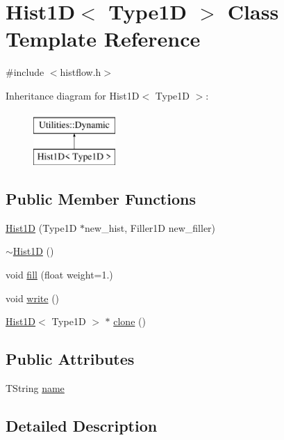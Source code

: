 \hypertarget{classHist1D}{}\section{Hist1D$<$ Type1D $>$ Class Template Reference}
\label{classHist1D}


{\ttfamily \#include $<$histflow.\+h$>$}

Inheritance diagram for Hist1D$<$ Type1D $>$\+:\begin{figure}[H]
\begin{center}
\leavevmode
\includegraphics[height=2.000000cm]{classHist1D}
\end{center}
\end{figure}
\subsection*{Public Member Functions}
\begin{DoxyCompactItemize}
\item 
\hyperlink{classHist1D_a76378975401f2dcd3635244ca8614664}{Hist1D} (Type1D $\ast$new\+\_\+hist, Filler1D new\+\_\+filler)
\item 
\hyperlink{classHist1D_a26a713a3b0f55a885fd6f110407990ee}{$\sim$\+Hist1D} ()
\item 
void \hyperlink{classHist1D_af9ae5dd7a2aca46be456dde196db8fba}{fill} (float weight=1.)
\item 
void \hyperlink{classHist1D_ae45c2073b4c8f25a10ac534012feb22b}{write} ()
\item 
\hyperlink{classHist1D}{Hist1D}$<$ Type1D $>$ $\ast$ \hyperlink{classHist1D_a6a35d7957cc8608f61d4605d70407fa6}{clone} ()
\end{DoxyCompactItemize}
\subsection*{Public Attributes}
\begin{DoxyCompactItemize}
\item 
T\+String \hyperlink{classHist1D_a28f350f4fd9e13199ef560ea6820d65c}{name}
\end{DoxyCompactItemize}


\subsection{Detailed Description}
